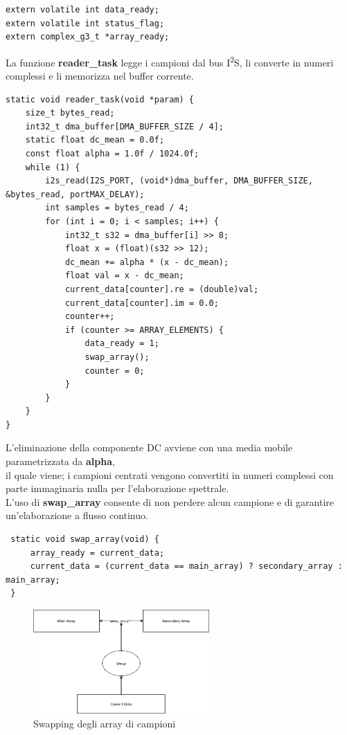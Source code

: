\begin{verbatim}
extern volatile int data_ready;
extern volatile int status_flag;
extern complex_g3_t *array_ready;
\end{verbatim}

La funzione \textbf{reader\_task} legge i campioni dal bus I\textsuperscript{2}S, li converte in numeri complessi e li memorizza nel buffer corrente.\\

\begin{verbatim}
static void reader_task(void *param) {
    size_t bytes_read;
    int32_t dma_buffer[DMA_BUFFER_SIZE / 4];
    static float dc_mean = 0.0f;
    const float alpha = 1.0f / 1024.0f;
    while (1) {
        i2s_read(I2S_PORT, (void*)dma_buffer, DMA_BUFFER_SIZE, &bytes_read, portMAX_DELAY);
        int samples = bytes_read / 4;
        for (int i = 0; i < samples; i++) {
            int32_t s32 = dma_buffer[i] >> 8;
            float x = (float)(s32 >> 12);
            dc_mean += alpha * (x - dc_mean);
            float val = x - dc_mean;
            current_data[counter].re = (double)val;
            current_data[counter].im = 0.0;
            counter++;
            if (counter >= ARRAY_ELEMENTS) {
                data_ready = 1;
                swap_array();
                counter = 0;
            }
        }
    }
}
\end{verbatim}

L’eliminazione della componente DC avviene con una media mobile parametrizzata da \textbf{alpha}, \\ 
il quale viene; i campioni centrati vengono convertiti in numeri complessi con parte immaginaria nulla per l’elaborazione spettrale.\\
L’uso di \textbf{swap\_array} consente di non perdere alcun campione e di garantire un’elaborazione a flusso continuo.  \\

\begin{verbatim}
 static void swap_array(void) {
     array_ready = current_data;
     current_data = (current_data == main_array) ? secondary_array : main_array;
 }
 \end{verbatim}

\begin{figure}[H]
    \centering
    \includegraphics[width=0.6\textwidth]{immagini/swapping_array.png}
    \caption{Swapping degli array di campioni}
    \label{fig:swapping_array}
\end{figure}


